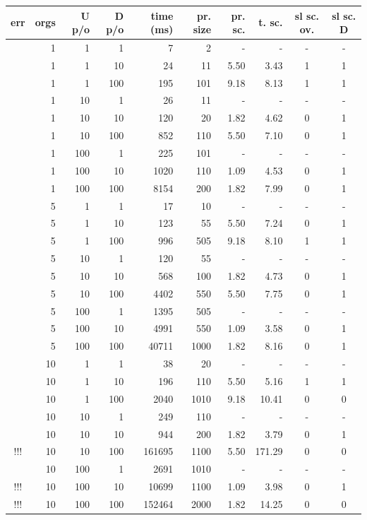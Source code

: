 \documentclass{l3proj}
\begin{document}
\begin{center}
  \begin{tabular}{ | c | r | r | r || r || r | r | r | c | c | }
    \hline
     \textbf{err} & \textbf{orgs} & \textbf{U p/o} & \textbf{D p/o} & \textbf{time (ms)} & \textbf{pr. size} & \textbf{pr. sc.} & \textbf{t. sc.} & \textbf{sl sc. ov.} & \textbf{sl sc. D} \\ \hline
      & 1 & 1 & 1 & 7 & 2 & - & - & - & - \\ \hline 
      & 1 & 1 & 10 & 24 & 11 & 5.50 & 3.43 & 1 & 1 \\ \hline 
      & 1 & 1 & 100 & 195 & 101 & 9.18 & 8.13 & 1 & 1 \\ \hline 
      & 1 & 10 & 1 & 26 & 11 & - & - & - & - \\ \hline 
      & 1 & 10 & 10 & 120 & 20 & 1.82 & 4.62 & 0 & 1 \\ \hline 
      & 1 & 10 & 100 & 852 & 110 & 5.50 & 7.10 & 0 & 1 \\ \hline 
      & 1 & 100 & 1 & 225 & 101 & - & - & - & - \\ \hline 
      & 1 & 100 & 10 & 1020 & 110 & 1.09 & 4.53 & 0 & 1 \\ \hline 
      & 1 & 100 & 100 & 8154 & 200 & 1.82 & 7.99 & 0 & 1 \\ \hline 
      & 5 & 1 & 1 & 17 & 10 & - & - & - & - \\ \hline 
      & 5 & 1 & 10 & 123 & 55 & 5.50 & 7.24 & 0 & 1 \\ \hline 
      & 5 & 1 & 100 & 996 & 505 & 9.18 & 8.10 & 1 & 1 \\ \hline 
      & 5 & 10 & 1 & 120 & 55 & - & - & - & - \\ \hline 
      & 5 & 10 & 10 & 568 & 100 & 1.82 & 4.73 & 0 & 1 \\ \hline 
      & 5 & 10 & 100 & 4402 & 550 & 5.50 & 7.75 & 0 & 1 \\ \hline 
      & 5 & 100 & 1 & 1395 & 505 & - & - & - & - \\ \hline 
      & 5 & 100 & 10 & 4991 & 550 & 1.09 & 3.58 & 0 & 1 \\ \hline 
      & 5 & 100 & 100 & 40711 & 1000 & 1.82 & 8.16 & 0 & 1 \\ \hline 
      & 10 & 1 & 1 & 38 & 20 & - & - & - & - \\ \hline 
      & 10 & 1 & 10 & 196 & 110 & 5.50 & 5.16 & 1 & 1 \\ \hline 
      & 10 & 1 & 100 & 2040 & 1010 & 9.18 & 10.41 & 0 & 0 \\ \hline 
      & 10 & 10 & 1 & 249 & 110 & - & - & - & - \\ \hline 
      & 10 & 10 & 10 & 944 & 200 & 1.82 & 3.79 & 0 & 1 \\ \hline 
     !!! & 10 & 10 & 100 & 161695 & 1100 & 5.50 & 171.29 & 0 & 0 \\ \hline 
      & 10 & 100 & 1 & 2691 & 1010 & - & - & - & - \\ \hline 
     !!! & 10 & 100 & 10 & 10699 & 1100 & 1.09 & 3.98 & 0 & 1 \\ \hline 
     !!! & 10 & 100 & 100 & 152464 & 2000 & 1.82 & 14.25 & 0 & 0 \\
    \hline
  \end{tabular}
\end{center}
\end{document}
